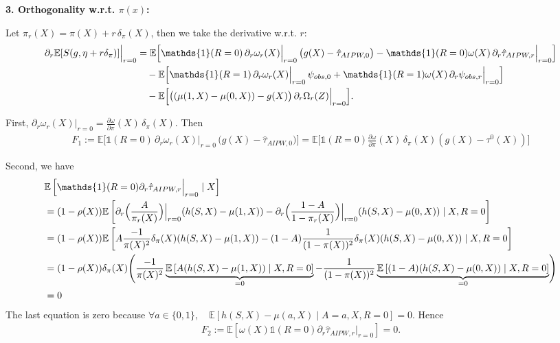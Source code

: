 \documentclass{article}
\theoremstyle{plain}
\theoremstyle{definition}
\theoremstyle{remark}
\newcommand{\E}{\mathbb{E}}                %
\newcommand{\1}{\mathds{1}}                %
\begin{document}
\textbf{3. Orthogonality w.r.t. $\pi(x)$:}

Let $\pi_r(X)=\pi(X)+r\,\delta_\pi(X)$, then we take the derivative w.r.t. $r$:
\begin{align}
\partial_r \E[S(g,\eta+r\delta_\pi)]\Big|_{r=0}
&=
\E\Big[
\1(R=0)\,\partial_r\omega_r(X)\Big|_{r=0}\,\big(g(X)-\hat\tau_{AIPW,0}\big)
-\1(R=0)\omega(X)\,\partial_r\hat\tau_{AIPW,r}\Big|_{r=0} \Big] \notag \\
&\quad
-\E\Big[\1(R=1)\,\partial_r\omega_r(X)\Big|_{r=0}\,\psi_{obs,0}
+\1(R=1)\omega(X)\,\partial_r\psi_{obs,r}\Big|_{r=0}\Big] \notag \\
&\quad
-\E\Big[\big((\mu(1,X)-\mu(0,X))-g(X)\big)\,\partial_r\Omega_r(Z)\Big|_{r=0}\Big].
\label{eq:pi-derivative-decomp}
\end{align}

First, $\partial_r\omega_r(X)|_{r=0} = \frac{\partial\omega}{\partial\pi}(X)\,\delta_\pi(X)$. Then
\begin{align}
\label{F1}
    F_1:=\E\Big[
\1(R=0)\,\partial_r\omega_r(X)\Big|_{r=0}\,\big(g(X)-\hat\tau_{AIPW,0}\big)\Big] = \E\Big[\1(R=0)\frac{\partial\omega}{\partial\pi}(X)\,\delta_\pi(X) (g(X)-\tau^0(X))\Big]
\end{align}

Second, we have
\begin{align}
\label{proof-partial-pi-1}
    &\E\left[\1(R=0)\partial_r\hat\tau_{AIPW,r}\Big|_{r=0} \mid X\right] \\
    &= (1-\rho(X))\E\left[\partial_r\Bigl(\frac{A}{\pi_r(X)}\Bigr)\Big|_{r=0}(h(S,X) - \mu(1,X)) - \partial_r\Bigl(\frac{1-A}{1-\pi_r(X)}\Bigr)\Big|_{r=0}(h(S,X) - \mu(0,X)) \mid X, R=0\right] \notag \\
    &= (1-\rho(X))\E\left[A\frac{-1}{\pi(X)^2}\delta_\pi(X)(h(S,X) - \mu(1,X)) - (1-A)\frac{1}{(1-\pi(X))^2}\delta_\pi(X)(h(S,X) - \mu(0,X)) \mid X, R=0\right] \notag \\
    &= (1-\rho(X))\delta_\pi(X)\Biggl(\frac{-1}{\pi(X)^2} \underbrace{\E\left[A(h(S,X) - \mu(1,X))  \mid X, R=0\right]}_{=0} - \frac{1}{(1-\pi(X))^2}\underbrace{\E\left[(1-A)(h(S,X) - \mu(0,X)) \mid X, R=0\right]}_{=0}\Biggr) \notag \\
    &=0
\end{align}
The last equation is zero because $\forall a \in \{0,1\}, \quad \E\left[h(S,X) - \mu(a,X) \mid A=a, X,R=0\right]=0$. Hence
\begin{align}
    F_2:= \E\left[\omega(X)\1(R=0)\partial_r\hat\tau_{AIPW,r}\Big|_{r=0} \right] = 0.
\end{align}
\end{document}
